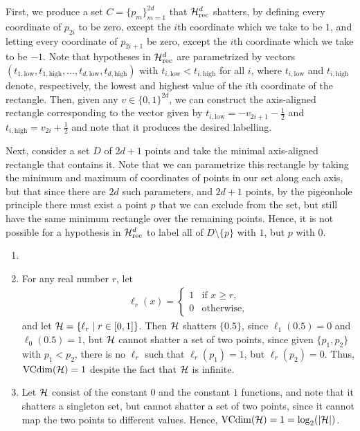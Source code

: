 \begin{ex}
  First, we produce a set $C=\{p_m\}_{m=1}^{2d}$ that $\mathcal{H}_{\text{rec}}^d$
  shatters, by defining every coordinate of $p_{2i}$ to be zero, except the
  $i$th coordinate which we take to be $1$, and letting every coordinate of
  ${p_{2i+1}}$ be zero, except the $i$th coordinate which we take to be $-1$.
  Note that hypotheses in $\mathcal{H}_{\text{rec}}^d$ are parametrized by vectors
  $(t_{1,\text{low}}, t_{1,\text{high}},\ldots,t_{d,\text{low}},t_{d,\text{high}})$
  with $t_{i,\text{low}}<t_{i,\text{high}}$ for all $i$, where
  $t_{i,\text{low}}$ and $t_{i,\text{high}}$ denote, respectively, the lowest
  and highest value of the $i$th coordinate of the rectangle. Then, given any
  $v\in\{0, 1\}^{2d}$, we can construct the axis-aligned rectangle corresponding
  to the vector given by $t_{i,\text{low}}=-v_{2i+1}-\frac{1}{2}$ and
  $t_{i,\text{high}}=v_{2i}+\frac{1}{2}$ and note that it produces the desired
  labelling.

  Next, consider a set $D$ of $2d+1$ points and take the minimal axis-aligned
  rectangle that contains it. Note that we can parametrize this rectangle by
  taking the minimum and maximum of coordinates of points in our set along each
  axis, but that since there are $2d$ such parameters, and $2d+1$ points, by the
  pigeonhole principle there must exist a point $p$ that we can exclude from the
  set, but still have the same minimum rectangle over the remaining points.
  Hence, it is not possible for a hypothesis in $\mathcal{H}_{\text{rec}}^d$ to label all
  of $D\setminus\{p\}$ with $1$, but $p$ with $0$.
\end{ex}

\begin{ex}
\end{ex}

\begin{ex}
  \begin{enumerate}
    \item[]
    \item For any real number $r$, let
          \begin{align*}
            \ell_r(x)=\begin{cases}
              1 & \text{if $x \geq r$}, \\
              0 & \text{otherwise},
            \end{cases}
          \end{align*}
          and let $\mathcal{H}=\{\ell_r \mid r\in [0, 1] \}$. Then $\mathcal{H}$ shatters
          $\{0.5\}$, since $\ell_1(0.5)=0$ and $\ell_0(0.5)=1$, but $\mathcal{H}$
          cannot shatter a set of two points, since given $\{p_1, p_2\}$ with
          $p_1 < p_2$, there is no $\ell_r$ such that $\ell_r(p_1) = 1$, but
          $\ell_r(p_2)=0$. Thus, $\operatorname*{VCdim}(\mathcal{H})=1$ despite the fact that $\mathcal{H}$ is
          infinite.
    \item Let $\mathcal{H}$ consist of the constant $0$ and the constant $1$ functions,
          and note that it shatters a singleton set, but cannot shatter a set of
          two points, since it cannot map the two points to different values.
          Hence, $\operatorname*{VCdim}(\mathcal{H})=1=\log_2(|\mathcal{H}|)$.
  \end{enumerate}
\end{ex}

